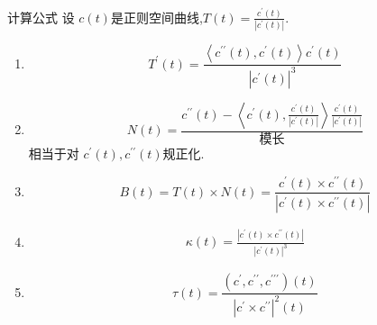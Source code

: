 \documentclass[../../古典微分几何.tex]{subfiles}
\begin{document}
\begin{proposition}{计算公式 }
    设 \(  c\left( t \right)   \)是正则空间曲线,\(  T\left( t \right)= \frac{c^{\prime} \left( t \right)  }{\left| c^{\prime} \left( t \right)  \right|  }    \).
    \begin{enumerate}
       

        \item \[
        T^{\prime} \left( t \right)=  \frac{ \left<c ^{\prime \prime} \left( t \right),c^{\prime} \left( t \right)   \right>c^{\prime} \left( t \right)  }{ \left| c^{\prime} \left( t \right)  \right|^{3} }   
        \]
        
        \item \[
        N\left( t \right)=  \frac{c ^{\prime \prime} \left( t \right)- \left<c^{\prime} \left( t \right), \frac{c^{\prime} \left( t \right)  }{\left| c^{\prime} \left( t \right)  \right|  }   \right>  \frac{c^{\prime} \left( t \right)  }{\left| c^{\prime} \left( t \right)  \right|  }  }{ \text{模长}}  
        \]相当于对 \(  c^{\prime} \left( t \right),c ^{\prime \prime} \left( t \right)    \)规正化.
        
        \item \[
        B\left( t \right)= T\left( t \right)\times N\left( t \right)   =  \frac{c^{\prime} \left( t \right)\times c ^{\prime \prime} \left( t \right)   }{\left| c^{\prime} \left( t \right)\times  c ^{\prime \prime} \left( t \right)   \right|  } 
        \]

        \item \[
          \begin{aligned}
            \kappa  \left( t \right)=   \frac{\left| c^{\prime} \left( t \right)\times  c ^{\prime \prime} \left( t \right)   \right|  }{\left| c^{\prime} \left( t \right)  \right|^{3}  } 
          \end{aligned}
           \]

        \item \[
        \tau \left( t \right)=  \frac{\left( c^{\prime} ,c ^{\prime \prime} ,c ^{\prime \prime\prime}  \right)\left( t \right)   }{\left| c^{\prime} \times c ^{\prime \prime}  \right|^{2}\left( t \right)   }  
        \]
    \end{enumerate}
    
\end{proposition}
\end{document}
